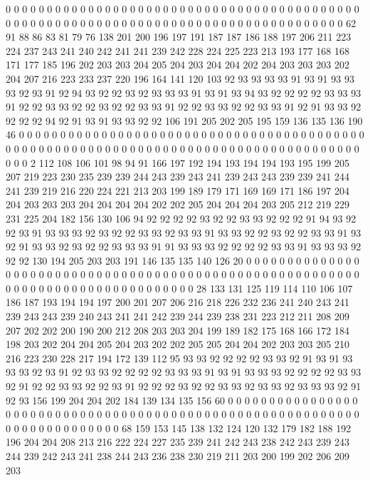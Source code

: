 0 0 0 0 0 0 0 0 0 0 0 0 0 0 0 0 0 0 0 0
0 0 0 0 0 0 0 0 0 0 0 0 0 0 0 0 0 0 0 0
0 0 0 0 0 0 0 0 0 0 0 0 0 0 0 0 0 0 0 0
0 0 0 0 0 0 0 0 0 0 0 0 0 0 0 0 0 0 0 0
0 0 0 0 62 91 88 86 83 81 79 76 138 201 200 196 197 191 187 187
186 188 197 206 211 223 224 237 243 241 240 242 241 241 239 242 228 224 225 223
213 193 177 168 168 171 177 185 196 202 203 203 204 205 204 203 204 204 202 204
203 203 203 202 204 207 216 223 233 237 220 196 164 141 120 103 92 93 93 93
93 91 93 91 93 93 93 92 93 91 92 94 93 92 92 93 92 93 93 93
91 93 91 93 94 93 92 92 92 92 93 93 93 91 92 92 93 93 92 92
93 92 92 93 93 91 92 92 93 93 92 92 93 93 91 92 91 93 93 92
92 92 92 94 92 91 93 91 93 93 92 92 106 191 205 202 205 195 159 136
135 136 190 46 0 0 0 0 0 0 0 0 0 0 0 0 0 0 0 0
0 0 0 0 0 0 0 0 0 0 0 0 0 0 0 0 0 0 0 0
0 0 0 0 0 0 0 0 0 0 0 0 0 0 0 0 0 0 0 0
0 0 0 0 0 0 0 0 0 0 0 0 0 0 0 0 0 0 0 0
0 0 0 0 0 0 0 0 0 0 0 0 2 112 108 106 101 98 94 91
166 197 192 194 193 194 194 193 195 199 205 207 219 223 230 235 239 239 244 243
239 243 241 239 243 243 239 239 241 244 241 239 219 216 220 224 221 213 203 199
189 179 171 169 169 171 186 197 204 204 203 203 203 204 204 204 204 202 202 205
204 204 204 203 205 212 219 229 231 225 204 182 156 130 106 94 92 92 92 92
93 92 92 93 93 92 92 92 91 94 93 92 92 93 91 93 93 93 92 93
92 92 93 93 92 93 93 91 93 93 92 92 93 92 92 93 93 91 93 92
91 93 93 92 93 92 92 93 93 93 91 91 93 93 93 92 92 92 92 93
93 91 93 93 93 92 92 92 130 194 205 203 203 191 146 135 135 140 126 20
0 0 0 0 0 0 0 0 0 0 0 0 0 0 0 0 0 0 0 0
0 0 0 0 0 0 0 0 0 0 0 0 0 0 0 0 0 0 0 0
0 0 0 0 0 0 0 0 0 0 0 0 0 0 0 0 0 0 0 0
0 0 0 0 0 0 0 0 0 0 0 0 0 0 0 0 0 0 0 0
28 133 131 125 119 114 110 106 107 186 187 193 194 194 197 200 201 207 206 216
218 226 232 236 241 240 243 241 239 243 243 239 240 243 241 241 242 239 244 239
238 231 223 212 211 208 209 207 202 202 200 190 200 212 208 203 203 204 199 189
182 175 168 166 172 184 198 203 202 204 204 205 204 203 202 202 205 205 204 204
202 203 203 205 210 216 223 230 228 217 194 172 139 112 95 93 93 92 92 92
92 93 93 92 91 93 91 93 93 93 92 93 91 92 93 93 92 92 92 92
93 93 93 91 93 91 93 93 93 92 92 92 92 93 93 92 91 92 92 93
93 92 92 93 91 92 92 92 93 92 92 93 93 92 93 93 92 93 93 93
92 91 92 93 156 199 204 204 202 184 139 134 135 156 60 0 0 0 0 0
0 0 0 0 0 0 0 0 0 0 0 0 0 0 0 0 0 0 0 0
0 0 0 0 0 0 0 0 0 0 0 0 0 0 0 0 0 0 0 0
0 0 0 0 0 0 0 0 0 0 0 0 0 0 0 0 0 0 0 0
0 0 0 0 0 0 0 0 68 159 153 145 138 132 124 120 132 179 182 188
192 196 204 204 208 213 216 222 224 227 235 239 241 242 243 238 242 243 239 243
244 239 242 243 241 238 244 243 236 238 230 219 211 203 200 199 202 206 209 203
